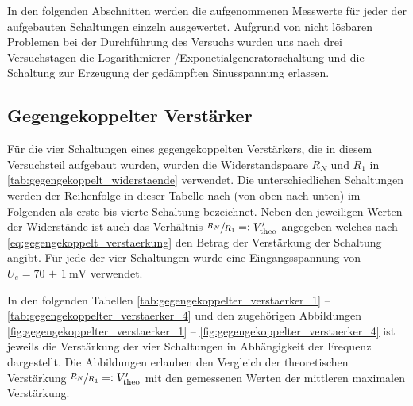 
In den folgenden Abschnitten werden die aufgenommenen Messwerte für jeder der
aufgebauten Schaltungen einzeln ausgewertet. Aufgrund von nicht lösbaren 
Problemen bei der Durchführung des Versuchs wurden uns nach drei Versuchstagen 
die Logarithmierer-/Exponetialgeneratorschaltung  und die Schaltung zur Erzeugung
der gedämpften Sinusspannung  erlassen.

\subsection{Gegengekoppelter Verstärker}

Für die vier Schaltungen eines gegengekoppelten Verstärkers, die 
in diesem Versuchsteil aufgebaut wurden, wurden die Widerstandspaare 
$R_{N}$ und  $R_{1}$ in \cref{tab:gegengekoppelt_widerstaende} verwendet.
Die unterschiedlichen Schaltungen werden der Reihenfolge in dieser Tabelle nach
(von oben nach unten) im Folgenden als erste bis vierte Schaltung bezeichnet.
Neben den jeweiligen Werten der Widerstände ist auch das Verhältnis 
$\sfrac{R_N}{R_1} =: V^{\prime}_{\mathrm{theo}}$
angegeben welches nach \cref{eq:gegengekoppelt_verstaerkung} den Betrag der Verstärkung
der Schaltung angibt. Für jede der vier Schaltungen wurde eine Eingangsspannung von 
$U_{e} = \SI{70(1)}{\milli\volt}$ verwendet.



In den folgenden Tabellen \ref{tab:gegengekoppelter_verstaerker_1} -- \ref{tab:gegengekoppelter_verstaerker_4}
und den zugehörigen Abbildungen \ref{fig:gegengekoppelter_verstaerker_1} -- \ref{fig:gegengekoppelter_verstaerker_4}
ist jeweils die Verstärkung der vier Schaltungen in Abhängigkeit der Frequenz dargestellt.
Die Abbildungen erlauben den Vergleich der theoretischen Verstärkung 
$\sfrac{R_N}{R_1} =: V^{\prime}_{\mathrm{theo}}$ mit den gemessenen Werten der mittleren maximalen Verstärkung. 

%

